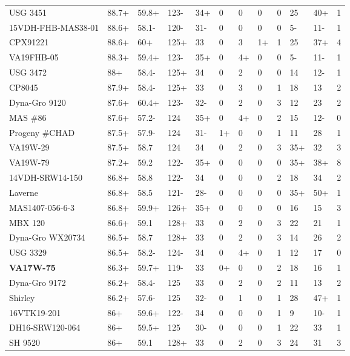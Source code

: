 \documentclass[12pt, letterpaper]{article}
\begin{document}
\begin{landscape}
\begin{ThreePartTable}
\begin{longtable}{llllllllllll}
  USG 3451 & 88.7+ & 59.8+ & 123- & 34+ & 0 & 0 & 0 & 0 & 25 & 40+ & 1 \\ 
  15VDH-FHB-MAS38-01 & 88.6+ & 58.1- & 120- & 31- & 0 & 0 & 0 & 0 & 5- & 11- & 1 \\ 
  CPX91221 & 88.6+ & 60+ & 125+ & 33 & 0 & 3 & 1+ & 1 & 25 & 37+ & 4 \\ 
  VA19FHB-05 & 88.3+ & 59.4+ & 123- & 35+ & 0 & 4+ & 0 & 0 & 5- & 11- & 1 \\ 
  USG 3472 & 88+ & 58.4- & 125+ & 34 & 0 & 2 & 0 & 0 & 14 & 12- & 1 \\ 
  CP8045 & 87.9+ & 58.4- & 125+ & 33 & 0 & 3 & 0 & 1 & 18 & 13 & 2 \\ 
  Dyna-Gro 9120 & 87.6+ & 60.4+ & 123- & 32- & 0 & 2 & 0 & 3 & 12 & 23 & 2 \\ 
  MAS \#86 & 87.6+ & 57.2- & 124 & 35+ & 0 & 4+ & 0 & 2 & 15 & 12- & 0 \\ 
  Progeny \#CHAD & 87.5+ & 57.9- & 124 & 31- & 1+ & 0 & 0 & 1 & 11 & 28 & 1 \\ 
  VA19W-29 & 87.5+ & 58.7 & 124 & 34 & 0 & 2 & 0 & 3 & 35+ & 32 & 3 \\ 
  VA19W-79 & 87.2+ & 59.2 & 122- & 35+ & 0 & 0 & 0 & 0 & 35+ & 38+ & 8 \\ 
  14VDH-SRW14-150 & 86.8+ & 58.8 & 122- & 34 & 0 & 0 & 0 & 2 & 18 & 34 & 2 \\ 
  Laverne & 86.8+ & 58.5 & 121- & 28- & 0 & 0 & 0 & 0 & 35+ & 50+ & 1 \\ 
  MAS1407-056-6-3 & 86.8+ & 59.9+ & 126+ & 35+ & 0 & 0 & 0 & 0 & 16 & 15 & 3 \\ 
  MBX 120 & 86.6+ & 59.1 & 128+ & 33 & 0 & 2 & 0 & 3 & 22 & 21 & 1 \\ 
  Dyna-Gro WX20734 & 86.5+ & 58.7 & 128+ & 33 & 0 & 2 & 0 & 3 & 14 & 26 & 2 \\ 
  USG 3329 & 86.5+ & 58.2- & 124- & 34 & 0 & 4+ & 0 & 1 & 12 & 17 & 0 \\ 
  \textbf{VA17W-75} & 86.3+ & 59.7+ & 119- & 33 & 0+ & 0 & 0 & 2 & 18 & 16 & 1 \\ 
  Dyna-Gro 9172 & 86.2+ & 58.4- & 125 & 33 & 0 & 2 & 0 & 2 & 11 & 13 & 2 \\ 
  Shirley & 86.2+ & 57.6- & 125 & 32- & 0 & 1 & 0 & 1 & 28 & 47+ & 1 \\ 
  16VTK19-201 & 86+ & 59.6+ & 122- & 34 & 0 & 0 & 0 & 1 & 9 & 10- & 1 \\ 
  DH16-SRW120-064 & 86+ & 59.5+ & 125 & 30- & 0 & 0 & 0 & 1 & 22 & 33 & 1 \\ 
  SH 9520 & 86+ & 59.1 & 128+ & 33 & 0 & 2 & 0 & 3 & 24 & 31 & 3 \\ 

\end{longtable}
\end{ThreePartTable}
\end{landscape}
\end{document}
